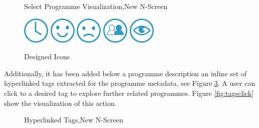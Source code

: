 \documentclass{acm_proc_article-sp}
\begin{document}
\begin{figure}[!htb]
\centering
{}
\caption{Select Programme Visualization,New N-Screen}
\label{fig:selectedprogramme}
\end{figure}


\begin{figure}[htbp]
    \centering
    {\includegraphics[width=0.5in]{images/on_watch_later.png}} 
    {\includegraphics[width=0.5in]{images/on_like.png}} 
    {\includegraphics[width=0.5in]{images/on_dislike.png}} 
    {\includegraphics[width=0.5in]{images/on_shared.png}} 
    {\includegraphics[width=0.5in]{images/on_recently_viewed.png}} 
    \caption{Designed Icons}
    \label{fig:colouredicon}
\end{figure}

Additionally, it has been added below a programme description an inline set of hyperlinked tags extracted for the programme metadata, see Figure \ref{fig:tags}. A user can click to a desired tag to explore further related programmes. Figure \ref{fig:tagsclick} show the visualization of this action. 

\begin{figure}[!htb]
\centering
{}
\caption{Hyperlinked Tags,New N-Screen}
\label{fig:tags}
\end{figure}
\end{document}
